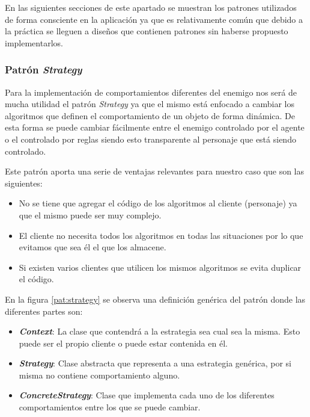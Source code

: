 \bigskip

En las siguientes secciones de este apartado se muestran los patrones utilizados de forma consciente en la aplicación ya que es relativamente común que debido a la práctica se lleguen a diseños que contienen patrones sin haberse propuesto implementarlos.

\bigskip

\subsubsection{Patrón \textit{Strategy}}

Para la implementación de comportamientos diferentes del enemigo nos será de mucha utilidad el patrón \textit{Strategy}  ya que el mismo está enfocado a cambiar los algoritmos que definen el comportamiento de un objeto de forma dinámica. De esta forma se puede cambiar fácilmente entre el enemigo controlado por el agente o el controlado por reglas siendo esto transparente al personaje que está siendo controlado.

\bigskip

Este patrón aporta una serie de ventajas relevantes para nuestro caso que son las siguientes:

\begin{itemize}
	\item No se tiene que agregar el código de los algoritmos al cliente (personaje) ya que el mismo puede ser muy complejo.
	\item El cliente no necesita todos los algoritmos en todas las situaciones por lo que evitamos que sea él el que los almacene.
	\item Si existen varios clientes que utilicen los mismos algoritmos se evita duplicar el código.
\end{itemize}

\bigskip

En la figura \ref{pat:strategy} se observa una definición genérica del patrón donde las diferentes partes son:

\begin{itemize}
	\item \textbf{\textit{Context}}: La clase que contendrá a la estrategia sea cual sea la misma. Esto puede ser el propio cliente o puede estar contenida en él.
	\item \textbf{\textit{Strategy}}: Clase abstracta que representa a una estrategia genérica, por si misma no contiene comportamiento alguno.
	\item \textbf{\textit{ConcreteStrategy}}: Clase que implementa cada uno de los diferentes comportamientos entre los que se puede cambiar.
\end{itemize}

